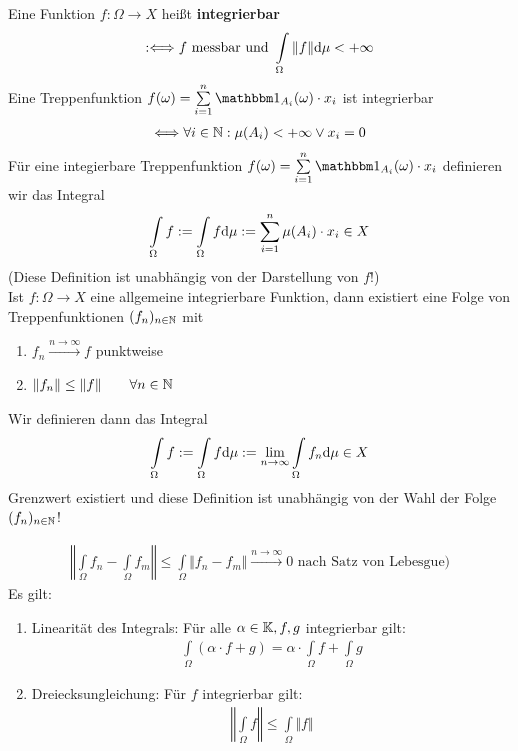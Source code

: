 Eine Funktion $f:\Omega\to X$ heißt \textbf{integrierbar}
\begin{align*}
	:\Longleftrightarrow f\text{ messbar und }\int\limits_\Omega\Vert f\Vert\mathrm{d}\mu<+\infty
\end{align*}
Eine Treppenfunktion $f(\omega)=\sum\limits_{i=1}^n\indi_{A_i}(\omega)\cdot x_i$ ist integrierbar
\begin{align*}
	\Longleftrightarrow\forall i\in\mathbb{N}: \mu(A_i)<+\infty\vee x_i=0
\end{align*}
Für eine integierbare Treppenfunktion $f(\omega)=\sum\limits_{i=1}^n\indi_{A_i}(\omega)\cdot x_i$ definieren wir das Integral
\begin{align*}
	\int\limits_\Omega f:=\int\limits_\Omega f\mathrm{d}\mu:=\sum\limits_{i=1}^n\mu(A_i)\cdot x_i\in X
\end{align*}
(Diese Definition ist unabhängig von der Darstellung von $f$!)\\
Ist $f:\Omega\to X$ eine allgemeine integrierbare Funktion, dann existiert eine Folge von Treppenfunktionen $(f_n)_{n\in\mathbb{N}}$ mit
\begin{enumerate}
	\item $f_n\stackrel{n\to\infty}{\longrightarrow} f$ punktweise
	\item $\begin{aligned}
		\Vert f_n\Vert\leq\Vert f\Vert\qquad\forall n\in\mathbb{N}
	\end{aligned}$
\end{enumerate}
Wir definieren dann das Integral 
\begin{align*}
	\int\limits_\Omega f:=\int\limits_\Omega f\mathrm{d}\mu:=\lim\limits_{n\to\infty} \int\limits_\Omega f_n\mathrm{d}\mu\in X
\end{align*}
Grenzwert existiert und diese Definition ist unabhängig von der Wahl der Folge $(f_n)_{n\in\mathbb{N}}$!

\begin{align*}
	\left\Vert\int\limits_\Omega f_n-\int\limits_\Omega f_m\right\Vert\leq\int\limits_\Omega\big\Vert f_n-f_m\big\Vert\stackrel{n\to\infty}{\longrightarrow}0\text{ nach Satz von Lebesgue)}
\end{align*}
Es gilt:
\begin{enumerate}[label=(\arabic*)]
	\item Linearität des Integrals: Für alle $\alpha\in\mathbb{K},f,g$ integrierbar gilt:
	\begin{align*}
		\int\limits_\Omega(\alpha\cdot f+g)=\alpha\cdot\int\limits_\Omega f+\int\limits_\Omega g
	\end{align*}
	\item Dreiecksungleichung: Für $f$ integrierbar gilt:
	\begin{align*}
		\left\Vert\int\limits_\Omega f\right\Vert\leq\int\limits_\Omega\Vert f\Vert
	\end{align*}
\end{enumerate}

